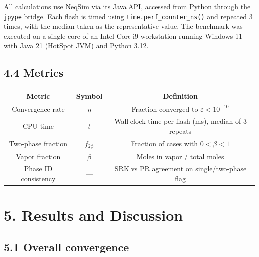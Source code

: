 \documentclass[review,3p]{custom}
\begin{document}
All calculations use NeqSim via its Java API, accessed from Python through the
\texttt{jpype} bridge. Each flash is timed using \texttt{time.perf_counter_ns()} and repeated
3 times, with the median taken as the representative value. The benchmark was
executed on a single core of an Intel Core i9 workstation running Windows 11
with Java 21 (HotSpot JVM) and Python 3.12.

\subsection{4.4 Metrics}

\begin{table}[htbp]
\centering
\begin{tabular}{ccc}
\toprule
Metric & Symbol & Definition \\
\midrule
Convergence rate & $\eta$ & Fraction converged to $\varepsilon < 10^{-10}$ \\
CPU time & $t$ & Wall-clock time per flash (ms), median of 3 repeats \\
Two-phase fraction & $f_{2\phi}$ & Fraction of cases with $0 < \beta < 1$ \\
Vapor fraction & $\beta$ & Moles in vapor / total moles \\
Phase ID consistency & — & SRK vs PR agreement on single/two-phase flag \\
\bottomrule
\end{tabular}
\end{table}


\section{5. Results and Discussion}



\subsection{5.1 Overall convergence}
\end{document}
